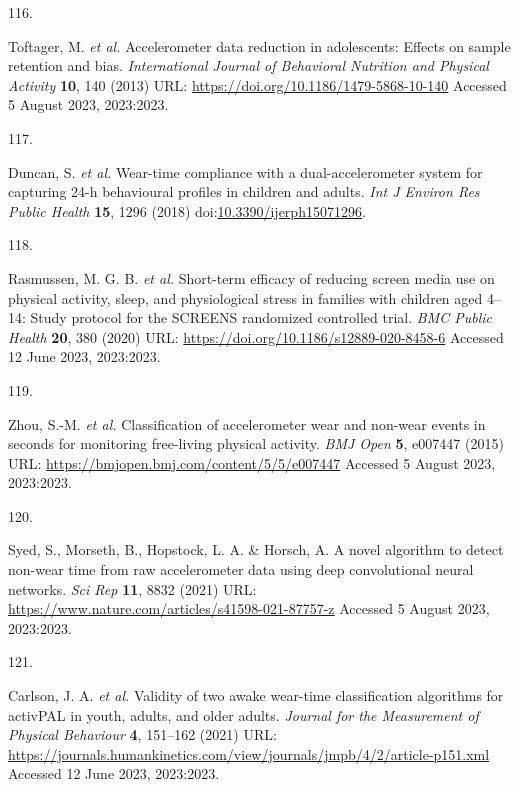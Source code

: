 \documentclass[
  10pt,
]{scrbook}
\newlength{\cslhangindent}
\newlength{\csllabelwidth}
\newlength{\cslentryspacingunit} %
\newenvironment{CSLReferences}[2] %
 {%
  \setlength{\parindent}{0pt}
  \ifodd #1
  \let\oldpar\par
  \def\par{\hangindent=\cslhangindent\oldpar}
  \fi
  \setlength{\parskip}{#2\cslentryspacingunit}
 }%
 {}
\newcommand{\CSLLeftMargin}[1]{\parbox[t]{\csllabelwidth}{#1}}
\newcommand{\CSLRightInline}[1]{\parbox[t]{\linewidth - \csllabelwidth}{#1}\break}
\let\originaltextbf\textbf
\renewcommand{\textbf}[1]{\textcolor{color1}{\textsf{\originaltextbf{#1}}}}
\begin{document}
\begin{CSLReferences}{0}{0}
\leavevmode{}%
\CSLLeftMargin{116. }%
\CSLRightInline{Toftager, M. \emph{et al.} Accelerometer data reduction
in adolescents: Effects on sample retention and bias.
\emph{International Journal of Behavioral Nutrition and Physical
Activity} \textbf{10}, 140 (2013) URL:
\url{https://doi.org/10.1186/1479-5868-10-140} Accessed 5 August 2023,
2023:2023.}

\leavevmode{}%
\CSLLeftMargin{117. }%
\CSLRightInline{Duncan, S. \emph{et al.} Wear-time compliance with a
dual-accelerometer system for capturing 24-h behavioural profiles in
children and adults. \emph{Int J Environ Res Public Health} \textbf{15},
1296 (2018)
doi:\href{https://doi.org/10.3390/ijerph15071296}{10.3390/ijerph15071296}.}

\leavevmode{}%
\CSLLeftMargin{118. }%
\CSLRightInline{Rasmussen, M. G. B. \emph{et al.} Short-term efficacy of
reducing screen media use on physical activity, sleep, and physiological
stress in families with children aged 4--14: Study protocol for the
{SCREENS} randomized controlled trial. \emph{{BMC} Public Health}
\textbf{20}, 380 (2020) URL:
\url{https://doi.org/10.1186/s12889-020-8458-6} Accessed 12 June 2023,
2023:2023.}

\leavevmode{}%
\CSLLeftMargin{119. }%
\CSLRightInline{Zhou, S.-M. \emph{et al.} Classification of
accelerometer wear and non-wear events in seconds for monitoring
free-living physical activity. \emph{{BMJ} Open} \textbf{5}, e007447
(2015) URL: \url{https://bmjopen.bmj.com/content/5/5/e007447} Accessed 5
August 2023, 2023:2023.}

\leavevmode{}%
\CSLLeftMargin{120. }%
\CSLRightInline{Syed, S., Morseth, B., Hopstock, L. A. \& Horsch, A. A
novel algorithm to detect non-wear time from raw accelerometer data
using deep convolutional neural networks. \emph{Sci Rep} \textbf{11},
8832 (2021) URL:
\url{https://www.nature.com/articles/s41598-021-87757-z} Accessed 5
August 2023, 2023:2023.}

\leavevmode{}%
\CSLLeftMargin{121. }%
\CSLRightInline{Carlson, J. A. \emph{et al.} Validity of two awake
wear-time classification algorithms for {activPAL} in youth, adults, and
older adults. \emph{Journal for the Measurement of Physical Behaviour}
\textbf{4}, 151--162 (2021) URL:
\url{https://journals.humankinetics.com/view/journals/jmpb/4/2/article-p151.xml}
Accessed 12 June 2023, 2023:2023.}


\end{CSLReferences}
\end{document}
